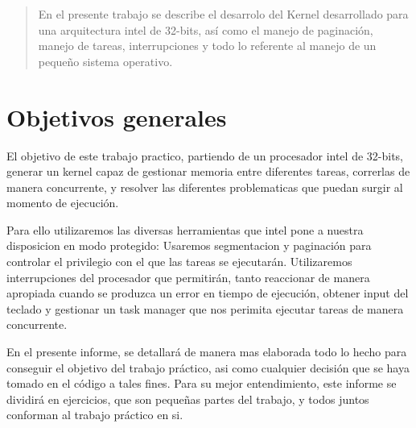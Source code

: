 \documentclass[a4paper]{article}
\begin{document}
\thispagestyle{empty}

\maketitle
\newpage

\thispagestyle{empty}
\vfill
\begin{abstract}
En el presente trabajo se describe el desarrolo del Kernel desarrollado para una arquitectura intel de 32-bits, así como el manejo de paginación, manejo de tareas, interrupciones y todo lo referente al manejo de un pequeño sistema operativo.

\end{abstract}

\thispagestyle{empty}
\vspace{3cm}
\tableofcontents
\newpage

\newpage

\section{Objetivos generales}

El objetivo de este trabajo practico, partiendo de un procesador intel de 32-bits, generar un kernel capaz de gestionar memoria entre diferentes tareas, correrlas de manera concurrente, y resolver las diferentes problematicas que puedan surgir al momento de ejecución.

Para ello utilizaremos las diversas herramientas que intel pone a nuestra disposicion en modo protegido: Usaremos segmentacion y paginación para controlar el privilegio con el que las tareas se ejecutarán.
Utilizaremos interrupciones del procesador que permitirán, tanto reaccionar de manera apropiada cuando se produzca un error en tiempo de ejecución, obtener input del teclado y gestionar un task manager que nos perimita ejecutar tareas de manera concurrente.

En el presente informe, se detallará de manera mas elaborada todo lo hecho para conseguir el objetivo del trabajo práctico, asi como cualquier decisión que se haya tomado en el código a tales fines. Para su mejor entendimiento, este informe se dividirá en ejercicios, que son pequeñas partes del trabajo, y todos juntos conforman al trabajo práctico en si. 
\end{document}
